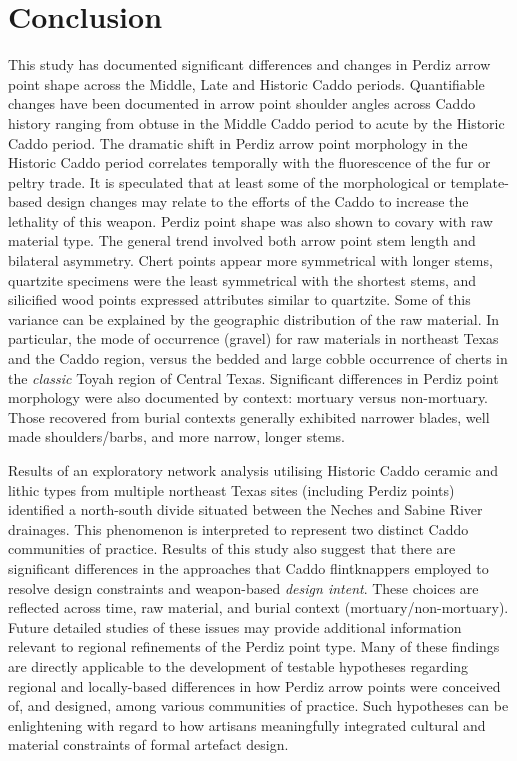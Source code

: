 \documentclass[review]{elsarticle}
\begin{document}
\section*{Conclusion}

This study has documented significant differences and changes in Perdiz arrow point shape across the Middle, Late and Historic Caddo periods. Quantifiable changes have been documented in arrow point shoulder angles across Caddo history ranging from obtuse in the Middle Caddo period to acute by the Historic Caddo period. The dramatic shift in Perdiz arrow point morphology in the Historic Caddo period correlates temporally with the fluorescence of the fur or peltry trade. It is speculated that at least some of the morphological or template-based design changes may relate to the efforts of the Caddo to increase the lethality of this weapon. Perdiz point shape was also shown to covary with raw material type. The general trend involved both arrow point stem length and bilateral asymmetry. Chert points appear more symmetrical with longer stems, quartzite specimens were the least symmetrical with the shortest stems, and silicified wood points expressed attributes similar to quartzite. Some of this variance can be explained by the geographic distribution of the raw material. In particular, the mode of occurrence (gravel) for raw materials in northeast Texas and the Caddo region, versus the bedded and large cobble occurrence of cherts in the \textit{classic} Toyah region of Central Texas. Significant differences in Perdiz point morphology were also documented by context: mortuary versus non-mortuary. Those recovered from burial contexts generally exhibited narrower blades, well made shoulders/barbs, and more narrow, longer stems.

Results of an exploratory network analysis utilising Historic Caddo ceramic and lithic types from multiple northeast Texas sites (including Perdiz points) identified a north-south divide situated between the Neches and Sabine River drainages. This phenomenon is interpreted to represent two distinct Caddo communities of practice. Results of this study also suggest that there are significant differences in the approaches that Caddo flintknappers employed to resolve design constraints and weapon-based \textit{design intent}. These choices are reflected across time, raw material, and burial context (mortuary/non-mortuary). Future detailed studies of these issues may provide additional information relevant to regional refinements of the Perdiz point type. Many of these findings are directly applicable to the development of testable hypotheses regarding regional and locally-based differences in how Perdiz arrow points were conceived of, and designed, among various communities of practice. Such hypotheses can be enlightening with regard to how artisans meaningfully integrated cultural and material constraints of formal artefact design.
\end{document}
